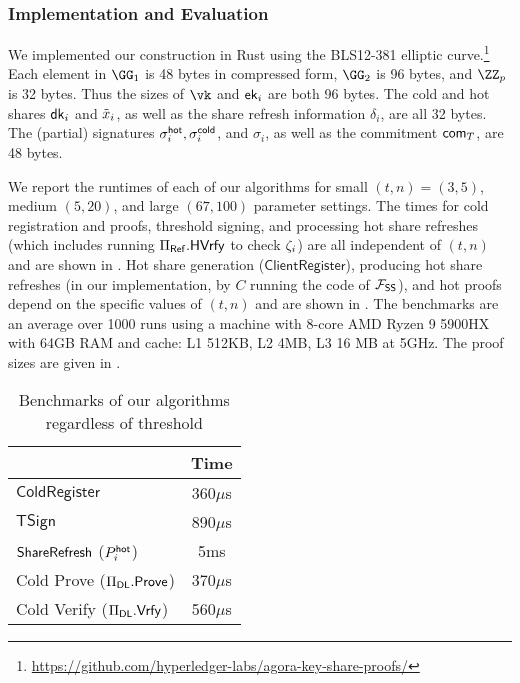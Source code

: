 \subsubsection{Implementation and Evaluation}\label{sec:eval}

We implemented our construction in Rust using the BLS12-381 elliptic curve.\footnote{\url{https://github.com/hyperledger-labs/agora-key-share-proofs/}}
Each element in $\GG_1$ is 48 bytes in compressed form, $\GG_2$ is 96 bytes, and $\ZZ_p$ is 32 bytes. Thus the sizes of $\vk$ and $\mathsf{ek}_i$ are both 96 bytes. The cold and hot shares $\mathsf{dk}_i$ and $\tilde{x}_i$, as well as the share refresh information $\delta_i$, are all 32 bytes. The (partial) signatures $\sigma_i^{\mathsf{hot}}, \sigma_i^{\mathsf{cold}}$, and $\sigma_i$, as well as the commitment $\mathsf{com}_{T}$, are 48 bytes. %

We report the runtimes of each of our algorithms for small $(t,n)=(3,5)$, %
medium $(5,20)$, %
and large $(67,100)$ parameter settings. %
The times for cold registration and proofs, threshold signing, and processing hot share refreshes (which includes running $\Pi_{\sf Ref}.{\sf H}\mathsf{Vrfy}$ to check $\zeta_i$) are all independent of $(t,n)$ and are shown in . Hot share generation ($\mathsf{ClientRegister}$), producing hot share refreshes (in our implementation, by $C$ running the code of $\mathcal{F}_\mathsf{SS}$), and hot proofs depend on the specific values of $(t,n)$ and are shown in .
The benchmarks are an average over 1000 runs using a machine with 8-core AMD Ryzen 9 5900HX with 64GB RAM and cache: L1 512KB, L2 4MB, L3 16 MB at 5GHz.
The proof sizes are given in . 

\begin{table}[tbh]
    \centering
    \begin{tabular}{lc}
        \toprule
        &
        Time \\\midrule
        $\mathsf{ColdRegister}$ & 360$\mu$s \\
        $\mathsf{TSign}$ & 890$\mu$s \\ 
        $\mathsf{ShareRefresh}$ ($P_i^{\mathsf{hot}}$) & 5ms \\
        Cold Prove ($\Pi_{\sf DL}.\mathsf{Prove}$) & 370$\mu$s \\
        Cold Verify ($\Pi_{\sf DL}.\mathsf{Vrfy}$) & 560$\mu$s \\\bottomrule
    \end{tabular}
    \caption{Benchmarks of our algorithms regardless of threshold}
    \label{tab:bench}
\end{table}

